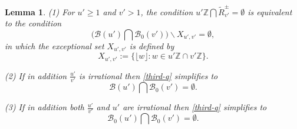 \documentclass[12pt,letterpaper, reqno]{amsart}
\newtheorem{lem}[thm]{Lemma}
\theoremstyle{definition}
\theoremstyle{remark}
\newcommand{\ZZ}{\ensuremath{\mathbb{Z}}}
\newcommand{\uu}{{u'}}
\newcommand{\vv}{{v'}}
\newcommand{\sB}{{\mathcal B}}
\newcommand{\floor}[1]{\lfloor{#1}\rfloor}
\begin{document}
\begin{lem}\label{lem:53}
(1) For ${\uu} \ge 1$ and  $\vv>1$, the 
condition ${\uu}\ZZ \bigcap \widetilde{R}_\vv^{\pm} = \emptyset$
is equivalent to the condition
 \begin{equation}\label{third-q}
\bigg( \sB({\uu}) \bigcap \sB_0({\vv})\bigg)  \smallsetminus  X_{\uu, \vv} = \emptyset ,
\end{equation}
in which the exceptional set  $X_{\uu,\vv}$ is defined by
\[
X_{\uu, \vv} := \{ \floor{ w } :  w \in {\uu} \ZZ \cap {\vv} \ZZ \}.
\] 


(2) If in addition $\frac{\uu}{\vv}$ is irrational then \eqref{third-q}
simplifies to
\begin{equation} \label{third-q-2}
\sB({\uu}) \bigcap \sB_0({\vv}) =\emptyset.
\end{equation}

(3) If in addition both $\frac{\uu}{\vv}$ and $\uu$  are irrational then \eqref{third-q} simplifies to 
\begin{equation} \label{third-q-3}
\sB_0({\uu}) \bigcap \sB_0({\vv}) =\emptyset.
\end{equation}
\end{lem}
\end{document}
